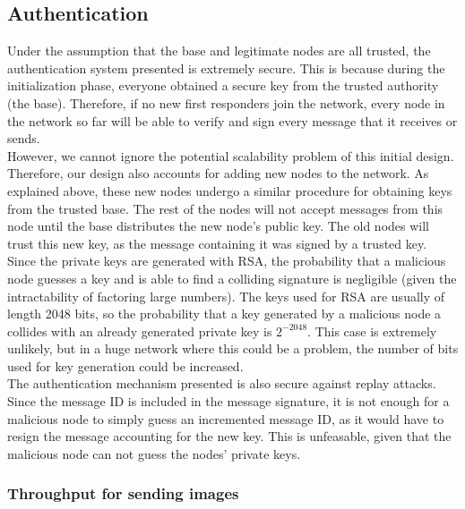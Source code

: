 \documentclass[letterpaper]{article}
\begin{document}
\subsection{Authentication}
Under the assumption that the base and legitimate nodes are all trusted, the authentication system presented is extremely secure. This is because during the initialization phase, everyone obtained a secure key from the trusted authority (the base). Therefore, if no new first responders join the network, every node in the network so far will be able to verify and sign every message that it receives or sends. \\

\noindent However, we cannot ignore the potential scalability problem of this initial design. Therefore, our design also accounts for adding new nodes to the network. As explained above, these new nodes undergo a similar procedure for obtaining keys from the trusted base. The rest of the nodes will not accept messages from this node until the base distributes the new node's public key. The old nodes will trust this new key, as the message containing it was signed by a trusted key.
\\

\noindent Since the private keys are generated with RSA, the probability that a malicious node guesses a key and is able to find a colliding signature is negligible (given the intractability of factoring large numbers). The keys used for RSA are usually of length 2048 bits, so the probability that a key generated by a malicious node a collides with an already generated private key is $2^{-2048}$. This case is extremely unlikely, but in a huge network where this could be a problem, the number of bits used for key generation could be increased.\\

\noindent The authentication mechanism presented is also secure against replay attacks. Since the message ID is included in the message signature, it is not enough for a malicious node to simply guess an incremented message ID, as it would have to resign the message accounting for the new key. This is unfeasable, given that the malicious node can not guess the nodes' private keys.

\subsubsection{Throughput for sending images}
\end{document}
